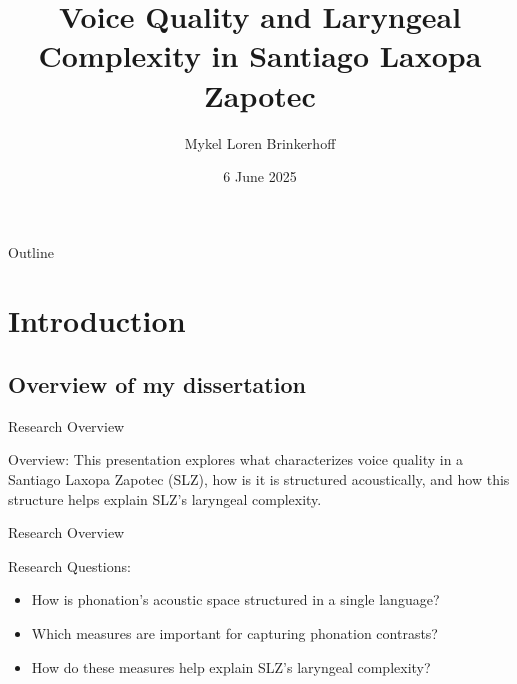 \documentclass[professionalfonts]{beamer}
\title[Voice Quality in SLZ] %
{Voice Quality and Laryngeal Complexity in Santiago Laxopa Zapotec}
\author[Brinkerhoff] %
{Mykel Loren Brinkerhoff}
\institute[UC Santa Cruz] %
{University of California, Santa Cruz}
\date[2025-06-06] %
{6 June 2025}
\begin{document}
\begin{frame}
  \titlepage
\end{frame}

\begin{frame}{Outline}
  \tableofcontents
\end{frame}




\section{Introduction}
\subsection{Overview of my dissertation}

\begin{frame}{Research Overview}
  \begin{block}{Overview:}
    This presentation explores what characterizes voice quality in a Santiago Laxopa Zapotec (SLZ), how is it is structured acoustically, and how this structure helps explain SLZ's laryngeal complexity.  
  \end{block}
\end{frame}

\begin{frame}{Research Overview}
  \begin{block}{Research Questions:}
    \begin{itemize}
      \item How is phonation's acoustic space structured in a single language?
      \item Which measures are important for capturing phonation contrasts?
      \item How do these measures help explain SLZ's laryngeal complexity?
    \end{itemize}
  \end{block}
\end{frame}
\end{document}
